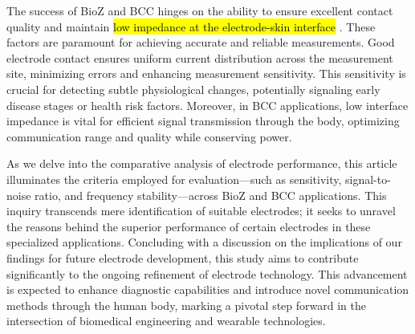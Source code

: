 
The success of BioZ and BCC hinges on the ability to ensure excellent contact quality and maintain \hl{low impedance at the electrode-skin interface} . These factors are paramount for achieving accurate and reliable measurements. Good electrode contact ensures uniform current distribution across the measurement site, minimizing errors and enhancing measurement sensitivity. This sensitivity is crucial for detecting subtle physiological changes, potentially signaling early disease stages or health risk factors. Moreover, in BCC applications, low interface impedance is vital for efficient signal transmission through the body, optimizing communication range and quality while conserving power.


As we delve into the comparative analysis of electrode performance, this article illuminates the criteria employed for evaluation—such as sensitivity, signal-to-noise ratio, and frequency stability—across BioZ and BCC applications. This inquiry transcends mere identification of suitable electrodes; it seeks to unravel the reasons behind the superior performance of certain electrodes in these specialized applications. Concluding with a discussion on the implications of our findings for future electrode development, this study aims to contribute significantly to the ongoing refinement of electrode technology. This advancement is expected to enhance diagnostic capabilities and introduce novel communication methods through the human body, marking a pivotal step forward in the intersection of biomedical engineering and wearable technologies.



